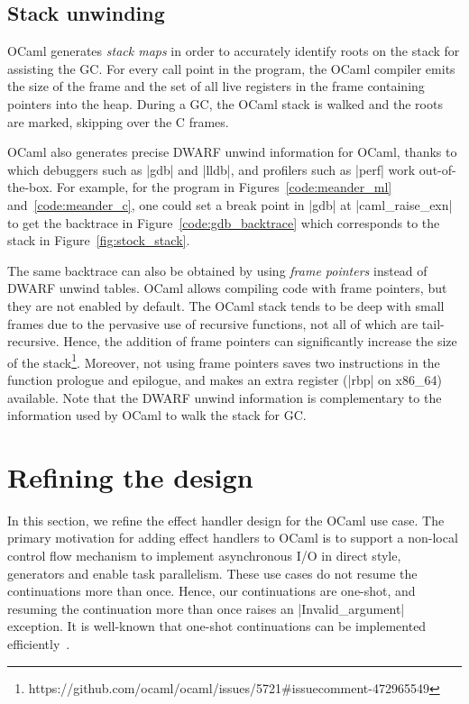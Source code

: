 \documentclass[sigplan,screen]{acmart}
\begin{document}
\subsection{Stack unwinding}
\label{sec:unwind}

OCaml generates \emph{stack maps} in order to accurately identify roots on the
stack for assisting the GC. For every call point in the program, the OCaml
compiler emits the size of the frame and the set of all live registers in the
frame containing pointers into the heap. During a GC, the OCaml stack is walked
and the roots are marked, skipping over the C frames.

OCaml also generates precise DWARF unwind information for OCaml, thanks to
which debuggers such as |gdb| and |lldb|, and profilers such as |perf| work
out-of-the-box. For example, for the program in Figures~\ref{code:meander_ml}
and~\ref{code:meander_c}, one could set a break point in |gdb| at
|caml_raise_exn| to get the backtrace in Figure~\ref{code:gdb_backtrace} which
corresponds to the stack in Figure~\ref{fig:stock_stack}.

The same backtrace can also be obtained by using \emph{frame pointers} instead
of DWARF unwind tables. OCaml allows compiling code with frame pointers, but
they are not enabled by default. The OCaml stack tends to be deep with small frames
due to the pervasive use of recursive functions, not all of which are
tail-recursive. Hence, the addition of frame pointers can significantly
increase the size of the
stack\footnote{https://github.com/ocaml/ocaml/issues/5721\#issuecomment-472965549}.
Moreover, not using frame pointers saves two instructions in the function
prologue and epilogue, and makes an extra register (|rbp| on x86\_64) available.
Note that the DWARF unwind information is complementary to the information used
by OCaml to walk the stack for GC.

\section{Refining the design}
\label{sec:refine}

In this section, we refine the effect handler design for the OCaml use case. The
primary motivation for adding effect handlers to OCaml is to support a non-local
control flow mechanism to implement asynchronous I/O in direct style, generators
and enable task parallelism. These use cases do not resume the continuations
more than once. Hence, our continuations are one-shot, and resuming the
continuation more than once raises an |Invalid_argument| exception. It is
well-known that one-shot continuations can be implemented
efficiently~\cite{Bruggeman96}.
\end{document}
